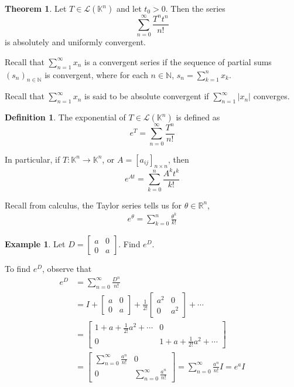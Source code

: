 \documentclass[11pt]{article}
\theoremstyle{definition}\newtheorem{definition}{Definition}
\theoremstyle{definition}\newtheorem{notation}{Notation}
\theoremstyle{definition}\newtheorem{example}{Example}
\theoremstyle{theorem}\newtheorem{theorem}{Theorem}
\theoremstyle{theorem}\newtheorem{corollary}{Corollary}
\theoremstyle{theorem}\newtheorem{proposition}{Proposition}
\theoremstyle{theorem}\newtheorem{lemma}{Lemma}
\theoremstyle{theorem}\newtheorem{question}{Question}
\theoremstyle{remark}\newtheorem{remark}{Remark}
\newcommand{\K}{\mathbb{K}}
\newcommand{\R}{\mathbb{R}}
\newcommand{\N}{\mathbb{N}}
\renewcommand{\L}{\mathscr{L}}
\begin{document}
\begin{theorem}
    Let $T \in \L(\K^n)$ and let $t_0 > 0$. Then the series
    \begin{equation*}
        \sum_{n = 0}^{\infty} \frac{T^n t^n}{n!}
    \end{equation*}
    is absolutely and uniformly convergent.
\end{theorem}

Recall that $\sum_{n = 1}^{\infty} x_n$ is a convergent series if the sequence of partial sums $(s_n)_{n \in \N}$ is convergent, where for each $n \in \N$, $s_n = \sum_{k = 1}^{n} x_k$.

Recall that $\sum_{n = 1}^{\infty} x_n$ is said to be absolute convergent if $\sum_{n = 1}^{\infty} |x_n|$ converges.

\begin{definition}
    The exponential of $T \in \L(\K^n)$ is defined as
    \begin{equation*}
        e^T = \sum_{n = 0}^{\infty} \frac{T^n}{n!}
    \end{equation*}
\end{definition}

In particular, if $T : \K^n \to \K^n$, or $A = [a_{ij}]_{n \times n}$, then
\begin{equation*}
    e^{At} = \sum_{k = 0}^{n} \frac{A^kt^k}{k!}
\end{equation*}

Recall from calculus, the Taylor series tells us for $\theta \in \R^n$,
\begin{align*}
    e^\theta = \sum_{k = 0}^{n} \frac{\theta^k}{k!}
\end{align*}

\begin{example}
    Let $D = \begin{bmatrix} a & 0 \\ 0 & a \end{bmatrix}$. Find $e^D$.
\end{example}

To find $e^D$, observe that
\begin{align*}
    e^D &= \sum_{n = 0}^{\infty} \frac{D^n}{n!} \\
    &= I + \begin{bmatrix} a & 0 \\ 0 & a \end{bmatrix} + \frac{1}{2!}\begin{bmatrix} a^2 & 0 \\ 0 & a^2 \end{bmatrix} + \cdots \\
    &= \begin{bmatrix}
        1 + a + \frac{1}{2!}a^2 + \cdots & 0 \\
        0 & 1 + a + \frac{1}{2!}a^2 + \cdots
    \end{bmatrix} \\
    &= \begin{bmatrix} \sum_{n = 0}^{\infty} \frac{a^n}{n!} & 0 \\ 0 & \sum_{n = 0}^{\infty} \frac{a^n}{n!} \end{bmatrix} = \sum_{n = 0}^{\infty} \frac{a^n}{n!} I = e^aI
\end{align*}
\end{document}
